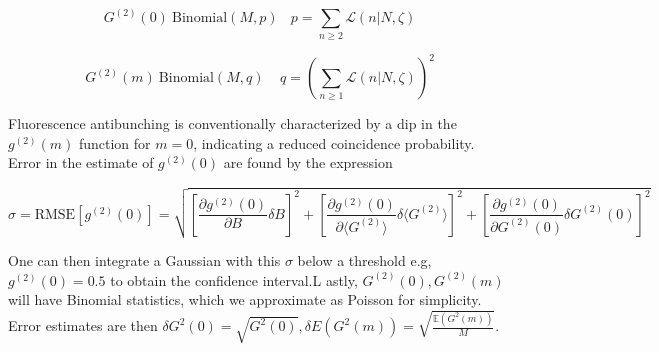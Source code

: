 \begin{equation*}
G^{(2)}(0)~\mathrm{Binomial}(M,p)\ \ \ \ p=\sum_{n\geq2}{\mathcal{L}(n\lvert N,\zeta)}
\end{equation*}

\begin{equation*}
G^{(2)}(m)~\mathrm{Binomial}\left(M,q\right)\ \ \ \ \ q=\left(\sum_{n\geq1}{\mathcal{L}(n\lvert N,\zeta)}\right)^2
\end{equation*}

Fluorescence antibunching is conventionally characterized by a dip in the $g^{(2)}(m)$ function for $m=0$, indicating a reduced coincidence probability. Error in the estimate of $g^{(2)}(0)$ are found by the expression


\begin{equation}
\sigma = \text{RMSE}[g^{(2)}(0)] = \sqrt{
    \left[
    \frac{\partial g^{(2)}(0)}{\partial B} \delta B
    \right]^2 +
    \left[
    \frac{\partial g^{(2)}(0)}{\partial \langle G^{(2)} \rangle} \delta \langle G^{(2)} \rangle
    \right]^2 +
    \left[
    \frac{\partial g^{(2)}(0)}{\partial G^{(2)}(0)} \delta G^{(2)}(0)
    \right]^2
}
\end{equation}

One can then integrate a Gaussian with this $\sigma$ below a threshold e.g, $g^{(2)}(0)=0.5$ to obtain the confidence interval.L astly, $G^{(2)}(0),G^{(2)}(m)$ will have Binomial statistics, which we approximate as Poisson for simplicity. Error estimates are then $\delta G^2(0) = \sqrt{G^2(0)}, \delta E(G^2(m)) = \sqrt{\frac{\mathbb{E}(G^2(m))}{M}}$.








